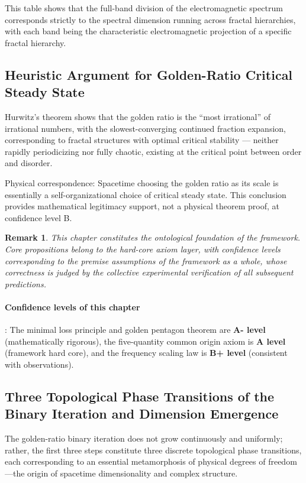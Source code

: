 \documentclass[12pt,a4paper,twocolumn]{article}
\newtheorem{remark}[theorem]{Remark}
\begin{document}
This table shows that the full-band division of the electromagnetic spectrum corresponds strictly to the spectral dimension running across fractal hierarchies, with each band being the characteristic electromagnetic projection of a specific fractal hierarchy.

\subsection{Heuristic Argument for Golden-Ratio Critical Steady State}
Hurwitz's theorem shows that the golden ratio is the ``most irrational'' of irrational numbers, with the slowest-converging continued fraction expansion, corresponding to fractal structures with optimal critical stability --- neither rapidly periodicizing nor fully chaotic, existing at the critical point between order and disorder.

Physical correspondence: Spacetime choosing the golden ratio as its scale is essentially a self-organizational choice of critical steady state. This conclusion provides mathematical legitimacy support, not a physical theorem proof, at confidence level B.

\begin{remark}
This chapter constitutes the ontological foundation of the framework. Core propositions belong to the hard-core axiom layer, with confidence levels corresponding to the premise assumptions of the framework as a whole, whose correctness is judged by the collective experimental verification of all subsequent predictions.
\end{remark}

\paragraph{Confidence levels of this chapter}: The minimal loss principle and golden pentagon theorem are \textbf{A- level} (mathematically rigorous), the five-quantity common origin axiom is \textbf{A level} (framework hard core), and the frequency scaling law is \textbf{B+ level} (consistent with observations).


\subsection{Three Topological Phase Transitions of the Binary Iteration and Dimension Emergence}
\label{subsec:three_phase_transitions}
The golden-ratio binary iteration does not grow continuously and uniformly; rather, the first three steps constitute three discrete topological phase transitions, each corresponding to an essential metamorphosis of physical degrees of freedom---the origin of spacetime dimensionality and complex structure.
\end{document}
